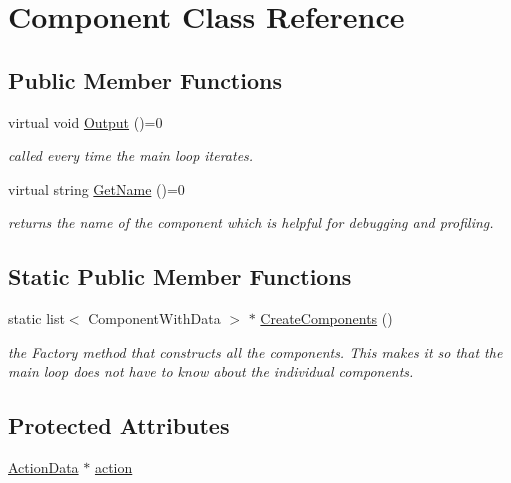 \hypertarget{class_component}{\section{\-Component \-Class \-Reference}
\label{class_component}
}
\subsection*{\-Public \-Member \-Functions}
\begin{DoxyCompactItemize}
\item 
\hypertarget{class_component_a7d4181cf107d1aee4128dc1c3670d120}{virtual void \hyperlink{class_component_a7d4181cf107d1aee4128dc1c3670d120}{\-Output} ()=0}\label{class_component_a7d4181cf107d1aee4128dc1c3670d120}

\begin{DoxyCompactList}\small\item\em called every time the main loop iterates. \end{DoxyCompactList}\item 
\hypertarget{class_component_a66794e7955105c819bb50c0cf0073192}{virtual string \hyperlink{class_component_a66794e7955105c819bb50c0cf0073192}{\-Get\-Name} ()=0}\label{class_component_a66794e7955105c819bb50c0cf0073192}

\begin{DoxyCompactList}\small\item\em returns the name of the component which is helpful for debugging and profiling. \end{DoxyCompactList}\end{DoxyCompactItemize}
\subsection*{\-Static \-Public \-Member \-Functions}
\begin{DoxyCompactItemize}
\item 
static list$<$ \-Component\-With\-Data $>$ $\ast$ \hyperlink{class_component_ab6f5ceb93adde86d8f93beb42cccb832}{\-Create\-Components} ()
\begin{DoxyCompactList}\small\item\em the \-Factory method that constructs all the components. \-This makes it so that the main loop does not have to know about the individual components. \end{DoxyCompactList}\end{DoxyCompactItemize}
\subsection*{\-Protected \-Attributes}
\begin{DoxyCompactItemize}
\item 
\hyperlink{class_action_data}{\-Action\-Data} $\ast$ \hyperlink{class_component_a16168a59f8d8e139632df65c2eb90dd4}{action}
\end{DoxyCompactItemize}



